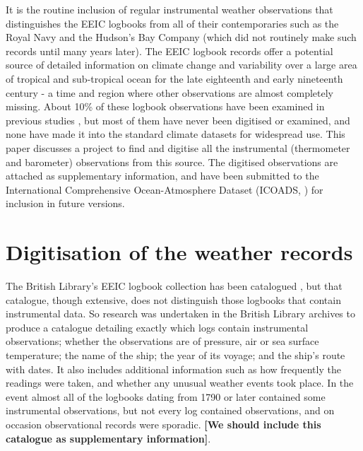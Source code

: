 \documentclass[CP]{copernicus}
\begin{document}
It is the routine inclusion of regular instrumental weather observations that distinguishes the EEIC logbooks from all of their contemporaries such as the Royal Navy and the Hudson's Bay Company (which did not routinely make such records until many years later). The EEIC logbook records offer a potential source of detailed information on climate change and variability over a large area of tropical and sub-tropical ocean for the late eighteenth and early nineteenth century - a time and region where other observations are almost completely missing. About 10\% of these logbook observations have been examined in previous studies \citep{chenoweth96,farrington98,chenoweth00homogenization}, but most of them have never been digitised or examined, and none have made it into the standard climate datasets for widespread use. This paper discusses a project to find and digitise all the instrumental (thermometer and barometer) observations from this source. The digitised observations are attached as supplementary information, and have been submitted to the International Comprehensive Ocean-Atmosphere Dataset (ICOADS, \citet{woodruff11icoads}) for inclusion in future versions.

\section{Digitisation of the weather records}

The British Library's EEIC logbook collection has been catalogued \citep{Farrington99}, but that catalogue, though extensive, does not distinguish those logbooks that contain instrumental data. So research was undertaken in the British Library archives to produce a catalogue detailing exactly which logs contain instrumental observations; whether the observations are of pressure, air or sea surface temperature; the name of the ship; the year of its voyage; and the ship's route with dates. It also includes additional information such as how frequently the readings were taken, and whether any unusual weather events took place. In the event almost all of the logbooks dating from 1790 or later contained some instrumental observations, but not every log contained observations, and on occasion observational records were sporadic.  {\bf[We should include this catalogue as supplementary information]}.
\end{document}
